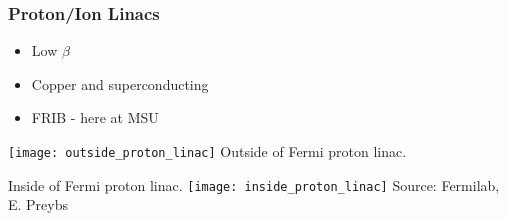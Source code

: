 \documentclass[professionalfonts,t]{beamer}
\begin{document}
\begin{frame}
	\frametitle{Proton/Ion Linacs}

\begin{minipage}{0.45\textwidth}
	\begin{itemize}
		\item Low $\beta$
		\item Copper and superconducting
		\item FRIB - here at MSU
	\end{itemize}
	\centering

	\texttt{[image: outside\_proton\_linac]}
	Outside of Fermi proton linac.
\end{minipage}\hfill
\begin{minipage}{0.45\textwidth}
	\vspace{-1em}
	\centering
	Inside of Fermi proton linac.
	\texttt{[image: inside\_proton\_linac]}
	Source: Fermilab, E. Preybs
\end{minipage}
\end{frame}


\end{document}
